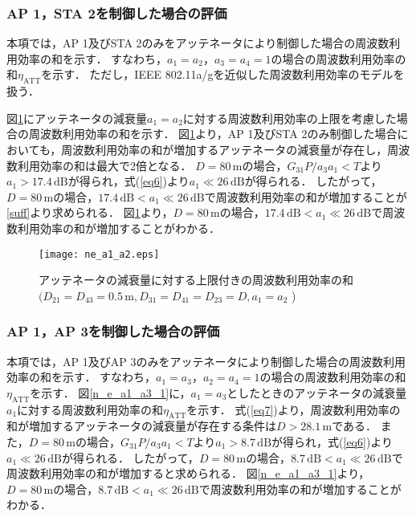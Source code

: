 \documentclass[master]{kuisthesis}		%
\begin{document}
\subsubsection{AP 1，STA 2を制御した場合の評価}\label{AP1STA2制御数値評価}
本項では，AP 1及びSTA 2のみをアッテネータにより制御した場合の周波数利用効率の和を示す．
すなわち，$a_1=a_2$，$a_3=a_4=1$の場合の周波数利用効率の和$\eta_\mathrm{ATT}$を示す．
ただし，IEEE 802.11a/gを近似した周波数利用効率のモデルを扱う．

図\ref{n_e_a1_a2}にアッテネータの減衰量$a_1=a_2$に対する周波数利用効率の上限を考慮した場合の周波数利用効率の和を示す．
図\ref{n_e_a1_a2}より，AP 1及びSTA 2のみ制御した場合においても，周波数利用効率の和が増加するアッテネータの減衰量が存在し，周波数利用効率の和は最大で2倍となる．
$D=80\,\mathrm{m}$の場合，$G_{31}P/a_3a_1<T$より$a_1>17.4\,\mathrm{dB}$が得られ，式(\ref{eq6})より$a_1 \ll 26\,\mathrm{dB}$が得られる．
したがって，$D=80\,\mathrm{m}$の場合，$17.4\,\mathrm{dB} < a_1 \ll 26\,\mathrm{dB}$で周波数利用効率の和が増加することが\ref{suff}より求められる．
図\ref{n_e_a1_a2}より，$D=80\,\mathrm{m}$の場合，$17.4\,\mathrm{dB} < a_1 \ll 26\,\mathrm{dB}$で周波数利用効率の和が増加することがわかる．
\ifnum {}
\begin{figure}[!t]
\centering
\texttt{[image: ne\_a1\_a2.eps]}
\caption{アッテネータの減衰量に対する上限付きの周波数利用効率の和   \newline $(D_{21}=D_{43}=0.5\,\mathrm{m},D_{31}=D_{41}=D_{23}=D,a_1=a_2$ )}
\label{n_e_a1_a2}
\end{figure}
\fi

\subsubsection{AP 1，AP 3を制御した場合の評価}
本項では，AP 1及びAP 3のみをアッテネータにより制御した場合の周波数利用効率の和を示す．
すなわち，$a_1=a_3$，$a_2=a_4=1$の場合の周波数利用効率の和$\eta_\mathrm{ATT}$を示す．
図\ref{n_e_a1_a3_1}に，$a_1=a_3$としたときのアッテネータの減衰量$a_1$に対する周波数利用効率の和$\eta_\mathrm{ATT}$を示す．
式(\ref{eq7})より，周波数利用効率の和が増加するアッテネータの減衰量が存在する条件は$D > 28.1\,\mathrm{m}$である．
また，$D=80\,\mathrm{m}$の場合，$G_{31}P/a_3a_1<T$より$a_1>8.7\,\mathrm{dB}$が得られ，式(\ref{eq6})より$a_1 \ll 26\,\mathrm{dB}$が得られる．
したがって，$D=80\,\mathrm{m}$の場合，$8.7\,\mathrm{dB} < a_1 \ll 26\,\mathrm{dB}$で周波数利用効率の和が増加すると求められる．
図\ref{n_e_a1_a3_1}より，$D=80\,\mathrm{m}$の場合，$8.7\,\mathrm{dB} < a_1 \ll 26\,\mathrm{dB}$で周波数利用効率の和が増加することがわかる．
\end{document}
